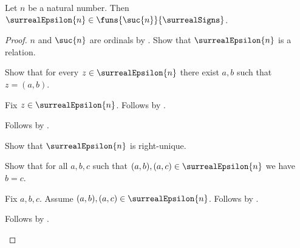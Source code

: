 \begin{proposition}\label{surreal_epsilon_function}
    Let $n$ be a natural number.
    Then $\surrealEpsilon{n}\in
        \funs{\suc{n}}{\surrealSigns}$.
\end{proposition}
\begin{proof}
    $n$ and $\suc{n}$ are ordinals
        by .
    Show that $\surrealEpsilon{n}$ is a relation.
    \begin{subproof}
        Show that for every $z\in\surrealEpsilon{n}$ there exist $a,b$
            such that $z=(a,b)$.
        \begin{subproof}
            Fix $z\in\surrealEpsilon{n}$.
            Follows by .
        \end{subproof}
        Follows by .
    \end{subproof}
    Show that $\surrealEpsilon{n}$ is right-unique.
    \begin{subproof}
        Show that for all $a,b,c$ such that
            $(a,b),(a,c)\in\surrealEpsilon{n}$ we have $b=c$.
        \begin{subproof}
            Fix $a,b,c$.
            Assume $(a,b),(a,c)\in\surrealEpsilon{n}$.
            Follows by .
        \end{subproof}
        Follows by .
    \end{subproof}


\end{proof}
